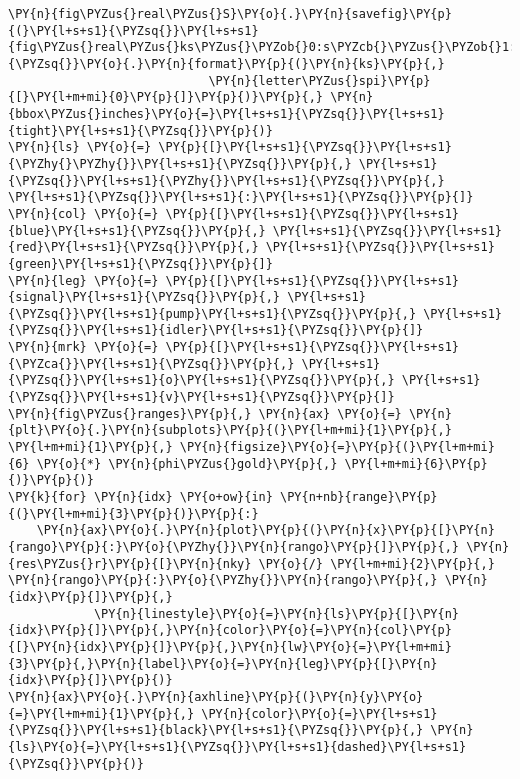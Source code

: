 \begin{Verbatim}[commandchars=\\\{\}]
\PY{n}{fig\PYZus{}real\PYZus{}S}\PY{o}{.}\PY{n}{savefig}\PY{p}{(}\PY{l+s+s1}{\PYZsq{}}\PY{l+s+s1}{fig\PYZus{}real\PYZus{}ks\PYZus{}\PYZob{}0:s\PYZcb{}\PYZus{}\PYZob{}1:s\PYZcb{}}\PY{l+s+s1}{\PYZsq{}}\PY{o}{.}\PY{n}{format}\PY{p}{(}\PY{n}{ks}\PY{p}{,}
                            \PY{n}{letter\PYZus{}spi}\PY{p}{[}\PY{l+m+mi}{0}\PY{p}{]}\PY{p}{)}\PY{p}{,} \PY{n}{bbox\PYZus{}inches}\PY{o}{=}\PY{l+s+s1}{\PYZsq{}}\PY{l+s+s1}{tight}\PY{l+s+s1}{\PYZsq{}}\PY{p}{)}
\PY{n}{ls} \PY{o}{=} \PY{p}{[}\PY{l+s+s1}{\PYZsq{}}\PY{l+s+s1}{\PYZhy{}\PYZhy{}}\PY{l+s+s1}{\PYZsq{}}\PY{p}{,} \PY{l+s+s1}{\PYZsq{}}\PY{l+s+s1}{\PYZhy{}}\PY{l+s+s1}{\PYZsq{}}\PY{p}{,} \PY{l+s+s1}{\PYZsq{}}\PY{l+s+s1}{:}\PY{l+s+s1}{\PYZsq{}}\PY{p}{]}
\PY{n}{col} \PY{o}{=} \PY{p}{[}\PY{l+s+s1}{\PYZsq{}}\PY{l+s+s1}{blue}\PY{l+s+s1}{\PYZsq{}}\PY{p}{,} \PY{l+s+s1}{\PYZsq{}}\PY{l+s+s1}{red}\PY{l+s+s1}{\PYZsq{}}\PY{p}{,} \PY{l+s+s1}{\PYZsq{}}\PY{l+s+s1}{green}\PY{l+s+s1}{\PYZsq{}}\PY{p}{]}
\PY{n}{leg} \PY{o}{=} \PY{p}{[}\PY{l+s+s1}{\PYZsq{}}\PY{l+s+s1}{signal}\PY{l+s+s1}{\PYZsq{}}\PY{p}{,} \PY{l+s+s1}{\PYZsq{}}\PY{l+s+s1}{pump}\PY{l+s+s1}{\PYZsq{}}\PY{p}{,} \PY{l+s+s1}{\PYZsq{}}\PY{l+s+s1}{idler}\PY{l+s+s1}{\PYZsq{}}\PY{p}{]}
\PY{n}{mrk} \PY{o}{=} \PY{p}{[}\PY{l+s+s1}{\PYZsq{}}\PY{l+s+s1}{\PYZca{}}\PY{l+s+s1}{\PYZsq{}}\PY{p}{,} \PY{l+s+s1}{\PYZsq{}}\PY{l+s+s1}{o}\PY{l+s+s1}{\PYZsq{}}\PY{p}{,} \PY{l+s+s1}{\PYZsq{}}\PY{l+s+s1}{v}\PY{l+s+s1}{\PYZsq{}}\PY{p}{]}
\PY{n}{fig\PYZus{}ranges}\PY{p}{,} \PY{n}{ax} \PY{o}{=} \PY{n}{plt}\PY{o}{.}\PY{n}{subplots}\PY{p}{(}\PY{l+m+mi}{1}\PY{p}{,} \PY{l+m+mi}{1}\PY{p}{,} \PY{n}{figsize}\PY{o}{=}\PY{p}{(}\PY{l+m+mi}{6} \PY{o}{*} \PY{n}{phi\PYZus{}gold}\PY{p}{,} \PY{l+m+mi}{6}\PY{p}{)}\PY{p}{)}
\PY{k}{for} \PY{n}{idx} \PY{o+ow}{in} \PY{n+nb}{range}\PY{p}{(}\PY{l+m+mi}{3}\PY{p}{)}\PY{p}{:}
    \PY{n}{ax}\PY{o}{.}\PY{n}{plot}\PY{p}{(}\PY{n}{x}\PY{p}{[}\PY{n}{rango}\PY{p}{:}\PY{o}{\PYZhy{}}\PY{n}{rango}\PY{p}{]}\PY{p}{,} \PY{n}{res\PYZus{}r}\PY{p}{[}\PY{n}{nky} \PY{o}{/} \PY{l+m+mi}{2}\PY{p}{,} \PY{n}{rango}\PY{p}{:}\PY{o}{\PYZhy{}}\PY{n}{rango}\PY{p}{,} \PY{n}{idx}\PY{p}{]}\PY{p}{,}
            \PY{n}{linestyle}\PY{o}{=}\PY{n}{ls}\PY{p}{[}\PY{n}{idx}\PY{p}{]}\PY{p}{,}\PY{n}{color}\PY{o}{=}\PY{n}{col}\PY{p}{[}\PY{n}{idx}\PY{p}{]}\PY{p}{,}\PY{n}{lw}\PY{o}{=}\PY{l+m+mi}{3}\PY{p}{,}\PY{n}{label}\PY{o}{=}\PY{n}{leg}\PY{p}{[}\PY{n}{idx}\PY{p}{]}\PY{p}{)}
\PY{n}{ax}\PY{o}{.}\PY{n}{axhline}\PY{p}{(}\PY{n}{y}\PY{o}{=}\PY{l+m+mi}{1}\PY{p}{,} \PY{n}{color}\PY{o}{=}\PY{l+s+s1}{\PYZsq{}}\PY{l+s+s1}{black}\PY{l+s+s1}{\PYZsq{}}\PY{p}{,} \PY{n}{ls}\PY{o}{=}\PY{l+s+s1}{\PYZsq{}}\PY{l+s+s1}{dashed}\PY{l+s+s1}{\PYZsq{}}\PY{p}{)}

\end{Verbatim}
